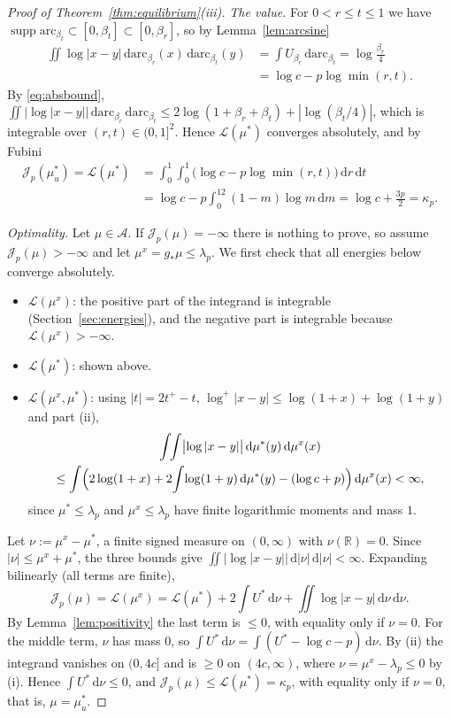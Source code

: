 \documentclass{amsart}
\theoremstyle{definition}
\theoremstyle{remark}
\numberwithin{equation}{section}
\newcommand{\R}{\mathbb{R}}
\newcommand{\cA}{\mathcal{A}}
\newcommand{\cJ}{\mathcal{J}}
\newcommand{\cL}{\mathcal{L}}
\newcommand{\dd}{\,\mathrm{d}}
\newcommand{\arc}{\mathrm{arc}}
\DeclareMathOperator{\supp}{supp}
\begin{document}
\begin{proof}[Proof of Theorem~\ref{thm:equilibrium}(iii)]
\emph{The value.} For $0<r\le t\le1$ we have $\supp\arc_{\beta_t}\subset[0,\beta_t]\subset[0,\beta_r]$, so by
Lemma~\ref{lem:arcsine}
\begin{align*}
  \iint\log|x-y|\dd\arc_{\beta_r}(x)\dd\arc_{\beta_t}(y)&=\int U_{\beta_r}\dd\arc_{\beta_t}=\log\frac{\beta_r}{4}\\
  &=\log c-p\log\min(r,t).
\end{align*}
By \eqref{eq:absbound}, $\iint|\log|x-y||\dd\arc_{\beta_r}\dd\arc_{\beta_t}\le2\log(1+\beta_r+\beta_t)+
|\log(\beta_t/4)|$, which is integrable over $(r,t)\in(0,1]^2$. Hence $\cL(\mu^*)$ converges absolutely, and by
Fubini
\begin{align*}
  \cJ_p(\mu^*_u)=\cL(\mu^*)&=\int_0^1\!\!\int_0^1\bigl(\log c-p\log\min(r,t)\bigr)\dd r\dd t\\
  &=\log c-p\int_0^12(1-m)\log m\dd m=\log c+\frac{3p}{2}=\kappa_p .
\end{align*}

\emph{Optimality.} Let $\mu\in\cA$. If $\cJ_p(\mu)=-\infty$ there is nothing to prove, so assume $\cJ_p(\mu)>-\infty$
and let $\mu^x=g_*\mu\le\lambda_p$. We first check that all energies below converge absolutely.
\begin{itemize}
\item $\cL(\mu^x)$: the positive part of the integrand is integrable (Section~\ref{sec:energies}), and the negative part is
  integrable because $\cL(\mu^x)>-\infty$.
\item $\cL(\mu^*)$: shown above.
\item $\cL(\mu^x,\mu^*)$: using $|t|=2t^+-t$, $\log^+|x-y|\le\log(1+x)+\log(1+y)$ and part (ii),
  \begin{multline*}
    \int\!\!\int\bigl|\log|x-y|\bigr|\dd\mu^*(y)\dd\mu^x(x)\\
    \le\int\Bigl(2\log(1+x)+2\!\int\!\log(1+y)\dd\mu^*(y)-(\log c+p)\Bigr)\dd\mu^x(x)<\infty,
  \end{multline*}
  since $\mu^*\le\lambda_p$ and $\mu^x\le\lambda_p$ have finite logarithmic moments and mass $1$.
\end{itemize}
Let $\nu:=\mu^x-\mu^*$, a finite signed measure on $(0,\infty)$ with $\nu(\R)=0$. Since $|\nu|\le\mu^x+\mu^*$,
the three bounds give $\iint|\log|x-y||\dd|\nu|\dd|\nu|<\infty$. Expanding bilinearly (all terms are finite),
\[
  \cJ_p(\mu)=\cL(\mu^x)=\cL(\mu^*)+2\int U^*\dd\nu+\iint\log|x-y|\dd\nu\dd\nu .
\]
By Lemma~\ref{lem:positivity} the last term is $\le0$, with equality only if $\nu=0$. For the middle term, $\nu$ has
mass $0$, so $\int U^*\dd\nu=\int(U^*-\log c-p)\dd\nu$. By (ii) the integrand vanishes on $(0,4c]$ and is $\ge0$ on
$(4c,\infty)$, where $\nu=\mu^x-\lambda_p\le0$ by (i). Hence $\int U^*\dd\nu\le0$, and
$\cJ_p(\mu)\le\cL(\mu^*)=\kappa_p$, with equality only if $\nu=0$, that is, $\mu=\mu^*_u$.
\end{proof}
\end{document}
